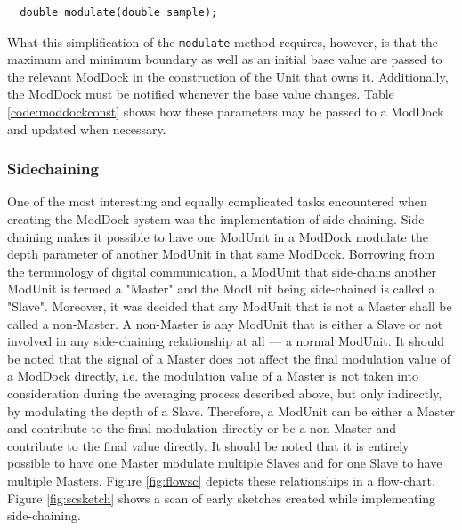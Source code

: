 \documentclass[12pt,twoside]{report}
\begin{document}
\begin{lstlisting}
  double modulate(double sample);
\end{lstlisting}

\noindent What this simplification of the \texttt{modulate} method requires, however, is that the maximum and minimum boundary as well as an initial base value are passed to the relevant ModDock in the construction of the Unit that owns it. Additionally, the ModDock must be notified whenever the base value changes. Table \ref{code:moddockconst} shows how these parameters may be passed to a ModDock and updated when necessary.

\begin{table}[ht!]
  \caption{}
  \label{code:moddockconst}
\end{table}

\pagebreak

\subsubsection{Sidechaining}

One of the most interesting and equally complicated tasks encountered when creating the ModDock system was the implementation of side-chaining. Side-chaining makes it possible to have one ModUnit in a ModDock modulate the depth parameter of another ModUnit in that same ModDock. Borrowing from the terminology of digital communication, a ModUnit that side-chains another ModUnit is termed a "Master" and the ModUnit being side-chained is called a "Slave". Moreover, it was decided that any ModUnit that is not a Master shall be called a non-Master. A non-Master is any ModUnit that is either a Slave or not involved in any side-chaining relationship at all --- a normal ModUnit. It should be noted that the signal of a Master does not affect the final modulation value of a ModDock directly, i.e. the modulation value of a Master is not taken into consideration during the averaging process described above, but only indirectly, by modulating the depth of a Slave. Therefore, a ModUnit can be either a Master and contribute to the final modulation directly or be a non-Master and contribute to the final value directly. It should be noted that it is entirely possible to have one Master modulate multiple Slaves and for one Slave to have multiple Masters. Figure \ref{fig:flowsc} depicts these relationships in a flow-chart. Figure \ref{fig:scsketch} shows a scan of early sketches created while implementing side-chaining.\\
\end{document}
